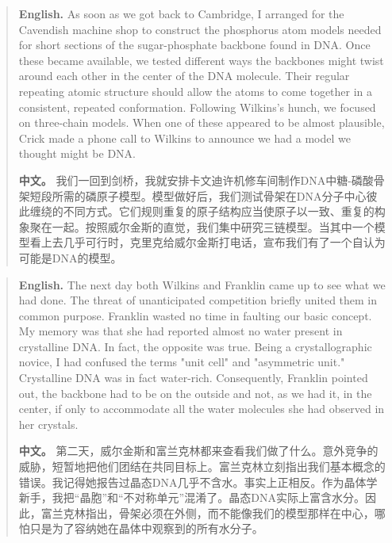 \begin{quote}
\noindent\textbf{English.} As soon as we got back to Cambridge, I arranged for the Cavendish machine shop to construct the phosphorus atom models needed for short sections of the sugar-phosphate backbone found in DNA. Once these became available, we tested different ways the backbones might twist around each other in the center of the DNA molecule. Their regular repeating atomic structure should allow the atoms to come together in a consistent, repeated conformation. Following Wilkins's hunch, we focused on three-chain models. When one of these appeared to be almost plausible, Crick made a phone call to Wilkins to announce we had a model we thought might be DNA.

\smallskip
\noindent\textbf{中文。} 我们一回到剑桥，我就安排卡文迪许机修车间制作DNA中糖-磷酸骨架短段所需的磷原子模型。模型做好后，我们测试骨架在DNA分子中心彼此缠绕的不同方式。它们规则重复的原子结构应当使原子以一致、重复的构象聚在一起。按照威尔金斯的直觉，我们集中研究三链模型。当其中一个模型看上去几乎可行时，克里克给威尔金斯打电话，宣布我们有了一个自认为可能是DNA的模型。
\end{quote}

\begin{quote}
\noindent\textbf{English.} The next day both Wilkins and Franklin came up to see what we had done. The threat of unanticipated competition briefly united them in common purpose. Franklin wasted no time in faulting our basic concept. My memory was that she had reported almost no water present in crystalline DNA. In fact, the opposite was true. Being a crystallographic novice, I had confused the terms "unit cell" and "asymmetric unit." Crystalline DNA was in fact water-rich. Consequently, Franklin pointed out, the backbone had to be on the outside and not, as we had it, in the center, if only to accommodate all the water molecules she had observed in her crystals.

\smallskip
\noindent\textbf{中文。} 第二天，威尔金斯和富兰克林都来查看我们做了什么。意外竞争的威胁，短暂地把他们团结在共同目标上。富兰克林立刻指出我们基本概念的错误。我记得她报告过晶态DNA几乎不含水。事实上正相反。作为晶体学新手，我把“晶胞”和“不对称单元”混淆了。晶态DNA实际上富含水分。因此，富兰克林指出，骨架必须在外侧，而不能像我们的模型那样在中心，哪怕只是为了容纳她在晶体中观察到的所有水分子。
\end{quote}

